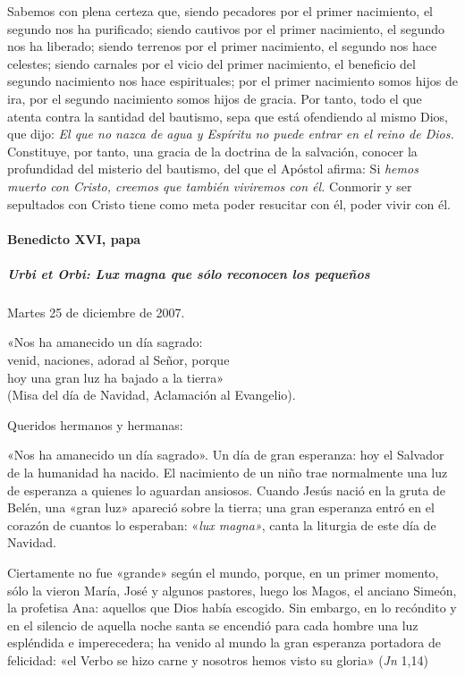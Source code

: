 \documentclass[]{article}
\let\oldparagraph\paragraph
\renewcommand{\paragraph}[1]{\oldparagraph{#1}\mbox{}}
\let\oldsubparagraph\subparagraph
\renewcommand{\subparagraph}[1]{\oldsubparagraph{#1}\mbox{}}
\begin{document}
Sabemos con plena certeza que, siendo pecadores por el primer
nacimiento, el segundo nos ha purificado; siendo cautivos por el primer
nacimiento, el segundo nos ha liberado; siendo terrenos por el primer
nacimiento, el segundo nos hace celestes; siendo carnales por el vicio
del primer nacimiento, el beneficio del segundo nacimiento nos hace
espirituales; por el primer nacimiento somos hijos de ira, por el
segundo nacimiento somos hijos de gracia. Por tanto, todo el que atenta
contra la santidad del bautismo, sepa que está ofendiendo al mismo Dios,
que dijo: \emph{El que no nazca de agua y Espíritu no puede entrar en el
reino de Dios.} Constituye, por tanto, una gracia de la doctrina de la
salvación, conocer la profundidad del misterio del bautismo, del que el
Apóstol afirma: Si \emph{hemos muerto con Cristo, creemos que también
viviremos con él.} Conmorir y ser sepultados con Cristo tiene como meta
poder resucitar con él, poder vivir con
él.\protect\hypertarget{_Ref448168848}{}{\protect\hypertarget{_Toc448662807}{}{\protect\hypertarget{_Toc448690326}{}{\protect\hypertarget{_Toc448708349}{}{\protect\hypertarget{_Toc448709435}{}{\protect\hypertarget{_Toc449554437}{}{}}}}}}

\paragraph{Benedicto XVI, papa}\label{benedicto-xvi-papa-5}

\subparagraph{Urbi et Orbi: Lux magna que sólo reconocen los
pequeños}\label{urbi-et-orbi-lux-magna-que-suxf3lo-reconocen-los-pequeuxf1os}

Martes 25 de diciembre de 2007.

«Nos ha amanecido un día sagrado:\\
venid, naciones, adorad al Señor, porque\\
hoy una gran luz ha bajado a la tierra»\\
(Misa del día de Navidad, Aclamación al Evangelio).

Queridos hermanos y hermanas:

«Nos ha amanecido un día sagrado». Un día de gran esperanza: hoy el
Salvador de la humanidad ha nacido. El nacimiento de un niño trae
normalmente una luz de esperanza a quienes lo aguardan ansiosos. Cuando
Jesús nació en la gruta de Belén, una «gran luz» apareció sobre la
tierra; una gran esperanza entró en el corazón de cuantos lo esperaban:
«\emph{lux magna»}, canta la liturgia de este día de Navidad.

Ciertamente no fue «grande» según el mundo, porque, en un primer
momento, sólo la vieron María, José y algunos pastores, luego los Magos,
el anciano Simeón, la profetisa Ana: aquellos que Dios había escogido.
Sin embargo, en lo recóndito y en el silencio de aquella noche santa se
encendió para cada hombre una luz espléndida e imperecedera; ha venido
al mundo la gran esperanza portadora de felicidad: «el Verbo se hizo
carne y nosotros hemos visto su gloria» (\emph{Jn} 1,14)
\end{document}
